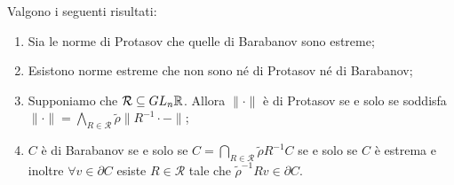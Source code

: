 \begin{lemma}
	Valgono i seguenti risultati:
	\begin{enumerate}
		\item Sia le norme di Protasov che quelle di Barabanov sono estreme; 
		\item Esistono norme estreme che non sono né di Protasov né di Barabanov;
		\item Supponiamo che $\mathcal R\subseteq GL_{n}\mathbb{R}$. Allora $\|\cdot\|$ è di Protasov se e solo se soddisfa $\|\cdot\| = \bigwedge_{R\in\mathcal R}\tilde\rho\|R^{-1}\cdot-\|$;
		\item $C$ è di Barabanov se e solo se $C = \bigcap_{R\in\mathcal R}\tilde\rho R^{-1}C$ se e solo se $C$ è estrema e inoltre $\forall v\in\partial C$ esiste $R\in\mathcal R$ tale che $\tilde\rho^{-1}Rv\in\partial C$.
	\end{enumerate}
\end{lemma}
